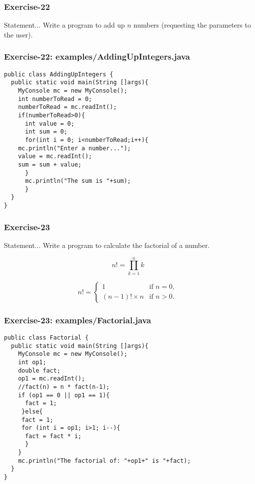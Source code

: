 \documentclass[xcolor=dvipsnames,dvip,notes=show,handout,table]{beamer}
\begin{document}
\begin{frame}[fragile]
\frametitle{Exercise-22}
\begin{block}{Statement...}
Write a program to add up $n$ numbers (requesting the parameters to the user).
\end{block}

\end{frame}


\begin{frame}[fragile]
\frametitle{Exercise-22: examples/AddingUpIntegers.java}
\scriptsize
\begin{lstlisting}
public class AddingUpIntegers {
  public static void main(String []args){
    MyConsole mc = new MyConsole();
    int numberToRead = 0;
    numberToRead = mc.readInt();
    if(numberToRead>0){
      int value = 0;
      int sum = 0;
      for(int i = 0; i<numberToRead;i++){
	mc.println("Enter a number...");
	value = mc.readInt();
	sum = sum + value;
      }
      mc.println("The sum is "+sum);
      }
  }
}
\end{lstlisting}
\end{frame}




\begin{frame}[fragile]
\frametitle{Exercise-23}
\begin{block}{Statement...}
Write a program to calculate the factorial of a number.
\end{block}


\begin{equation}
n!=\prod_{k=1}^n k \!  
\end{equation}


\begin{equation}
n! = \begin{cases}
1 & \text{if } n = 0, \\
(n-1)!\times n & \text{if } n > 0.
\end{cases}
\end{equation}


\end{frame}


\begin{frame}[fragile]
\frametitle{Exercise-23: examples/Factorial.java}
\scriptsize
\begin{lstlisting}
public class Factorial {
  public static void main(String []args){
    MyConsole mc = new MyConsole();
    int op1;
    double fact;
    op1 = mc.readInt();
    //fact(n) = n * fact(n-1);
    if (op1 == 0 || op1 == 1){
      fact = 1;
     }else{
     fact = 1;
     for (int i = op1; i>1; i--){
      fact = fact * i; 
      }
    }
    mc.println("The factorial of: "+op1+" is "+fact);
  }
}
\end{lstlisting}
\end{frame}
\end{document}
